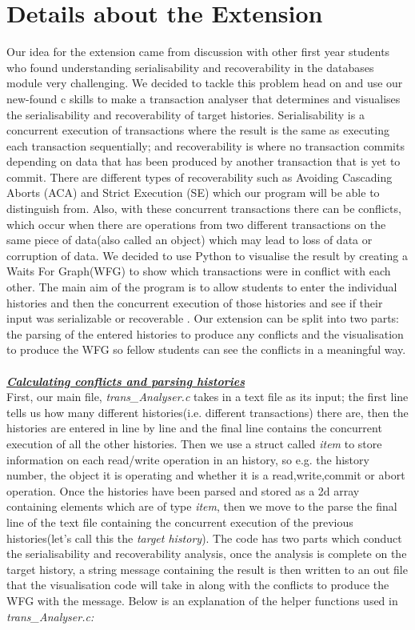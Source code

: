 \documentclass[a4paper]{article}
\begin{document}
\section{Details about the Extension}
Our idea for the extension came from discussion with other first year students who found understanding serialisability and recoverability in the databases module very challenging. We decided to tackle this problem head on and use our new-found c skills to make a transaction analyser that determines and visualises the serialisability and recoverability of target histories.  Serialisability is a concurrent execution of transactions where the result is the same as executing each transaction sequentially; and recoverability is where no transaction commits depending on data that has been produced by another transaction that is yet to commit. There are different types of recoverability  such as Avoiding Cascading Aborts (ACA) and Strict Execution (SE) which our program will be able to distinguish from. Also, with these concurrent transactions there can be conflicts, which occur when there are operations from two different transactions on the same piece of data(also called an object) which may lead to loss of data or corruption of data. We decided to use Python to visualise the result by creating a Waits For Graph(WFG) to show which transactions were in conflict with each other. The main aim of the program is to allow students to enter the individual histories and then the concurrent execution of those histories and see if their input was serializable or recoverable . Our extension can be split into two parts: the parsing of the entered histories to produce any conflicts and the visualisation to produce the WFG so fellow students can see the conflicts in a meaningful way. 
\\\\
\textbf{\textit{\underline{Calculating conflicts and parsing histories}}}\\
First, our main file, \textit{trans\_Analyser.c} takes in a text file as its input; the first line tells us how many different histories(i.e. different transactions) there are, then the histories are entered in line by line and the final line contains the concurrent execution of all the other histories. Then we use a struct called \textit{item} to store information on each read/write operation in an history, so e.g. the history number, the object it is operating and whether it is a read,write,commit or abort operation. Once the histories have been parsed and stored as a 2d array containing elements which are of type \textit{item}, then we move to the parse the final line of the text file containing the concurrent execution of the previous histories(let's call this the \textit{target history}). The code has two parts which conduct the serialisability and recoverability analysis, once the analysis is complete on the target history, a string message containing the result is then written to an out file that the visualisation code will take in along with the conflicts to produce the WFG with the message. Below is an explanation of the helper functions used in  \textit{trans\_Analyser.c: }
\end{document}
